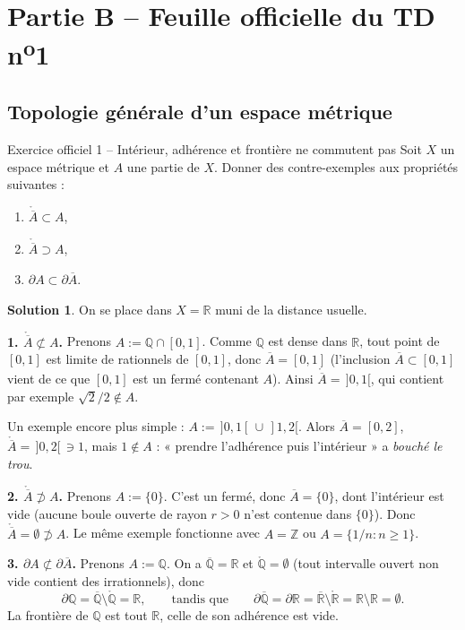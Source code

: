 \documentclass[11pt,a4paper]{article}
\newcommand{\R}{\mathbb{R}}
\newcommand{\Z}{\mathbb{Z}}
\newcommand{\Q}{\mathbb{Q}}
\newcommand{\interieur}[1]{\mathring{#1}}
\newcommand{\adh}[1]{\overline{#1}}
\theoremstyle{definition}
\newtheorem*{solution}{Solution}
\begin{document}
\section*{Partie B -- Feuille officielle du TD n\textsuperscript{o}1}

\subsection*{Topologie générale d'un espace métrique}

\begin{exo}{Exercice officiel 1 -- Intérieur, adhérence et frontière ne commutent pas}
Soit $X$ un espace métrique et $A$ une partie de $X$. Donner des contre-exemples aux propriétés suivantes :
\begin{enumerate}[label=\arabic*.]
  \item $\interieur{\adh{A}} \subset A$,
  \item $\interieur{\adh{A}} \supset A$,
  \item $\partial A \subset \partial \adh{A}$.
\end{enumerate}
\end{exo}

\begin{solution}
On se place dans $X=\R$ muni de la distance usuelle.

\medskip
\noindent\textbf{1. $\interieur{\adh{A}}\not\subset A$.} Prenons $A := \Q\cap[0,1]$. Comme $\Q$ est dense dans $\R$, tout point de $[0,1]$ est limite de rationnels de $[0,1]$, donc $\adh{A}=[0,1]$ (l'inclusion $\adh{A}\subset[0,1]$ vient de ce que $[0,1]$ est un fermé contenant $A$). Ainsi $\interieur{\adh{A}} = \,]0,1[$, qui contient par exemple $\sqrt2/2\notin A$.

Un exemple encore plus simple : $A := \,]0,1[\,\cup\,]1,2[$. Alors $\adh{A}=[0,2]$, $\interieur{\adh{A}}=\,]0,2[\,\ni 1$, mais $1\notin A$ : « prendre l'adhérence puis l'intérieur » a \emph{bouché le trou}.

\medskip
\noindent\textbf{2. $\interieur{\adh{A}}\not\supset A$.} Prenons $A := \{0\}$. C'est un fermé, donc $\adh{A}=\{0\}$, dont l'intérieur est vide (aucune boule ouverte de rayon $r>0$ n'est contenue dans $\{0\}$). Donc $\interieur{\adh{A}}=\emptyset\not\supset A$. Le même exemple fonctionne avec $A=\Z$ ou $A=\{1/n : n\ge1\}$.

\medskip
\noindent\textbf{3. $\partial A\not\subset\partial\adh{A}$.} Prenons $A:=\Q$. On a $\adh{\Q}=\R$ et $\interieur{\Q}=\emptyset$ (tout intervalle ouvert non vide contient des irrationnels), donc
\[
\partial\Q = \adh{\Q}\setminus\interieur{\Q} = \R,
\qquad\text{tandis que}\qquad
\partial\adh{\Q} = \partial\R = \adh{\R}\setminus\interieur{\R} = \R\setminus\R = \emptyset .
\]
La frontière de $\Q$ est tout $\R$, celle de son adhérence est vide.
\end{solution}
\end{document}
